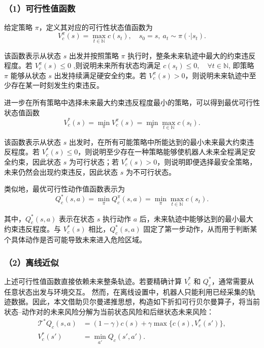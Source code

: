 \subsubsection{（1）可行性值函数}

给定策略 $\pi$，定义其对应的可行性状态值函数为
\begin{equation}
    V_c^\pi(s)
    =
    \max_{t\in\mathbb{N}} c(s_t),
    \quad
    s_0=s,\ a_t\sim\pi(\cdot|s_t).
    \label{eq:vc_pi}
\end{equation}

该函数表示从状态 $s$ 出发并按照策略 $\pi$ 执行时，整条未来轨迹中最大的约束违反程度。若 $V_c^\pi(s)\leq 0$ ,则说明未来所有状态均满足 $c(s_t)\leq 0,\quad \forall t\in\mathbb{N}$,
即策略 $\pi$ 能够从状态 $s$ 出发持续满足硬安全约束。若 $V_c^\pi(s)>0$，则说明未来轨迹中至少存在某一时刻发生约束违反。

进一步在所有策略中选择未来最大约束违反程度最小的策略，可以得到最优可行性状态值函数
\begin{equation}
    V_c^*(s)
    =
    \min_{\pi}V_c^\pi(s)
    =
    \min_{\pi}\max_{t\in\mathbb{N}}c(s_t).
    \label{eq:vc_star}
\end{equation}

该函数表示从状态 $s$ 出发时，在所有可能策略中所能达到的最小未来最大约束违反程度。若 $V_c^*(s)\leq 0$，则说明至少存在一种策略能够使机器人未来全程满足安全约束，因此状态 $s$ 为可行状态；若 $V_c^*(s)>0$，则说明即便选择最安全策略，未来仍然会出现约束违反，因此状态 $s$ 为不可行状态。

类似地，最优可行性动作值函数表示为
\begin{equation}
    Q_c^*(s,a)
    =
    \min_{\pi}Q_c^\pi(s,a)
    =
    \min_{\pi}\max_{t\in\mathbb{N}}c(s_t).
    \label{eq:qc_star}
\end{equation}

其中，$Q_c^*(s,a)$ 表示在状态 $s$ 执行动作 $a$ 后，未来轨迹中能够达到的最小最大约束违反程度。与 $V_c^*(s)$ 相比，$Q_c^*(s,a)$ 固定了第一步动作，从而用于判断某个具体动作是否可能导致未来进入危险区域。

\subsubsection{（2）离线近似}

上述可行性值函数直接依赖未来整条轨迹。若要精确计算 $V_c^*$ 和 $Q_c^*$，通常需要从任意状态出发与环境交互。
然而，在离线设置中，机器人只能利用已经采集的轨迹数据。因此，本文借助贝尔曼递推思想，构造如下折扣可行贝尔曼算子，将当前状态--动作对的未来风险分解为当前状态风险和后继状态未来风险：
\begin{align}
    \mathcal{T}^*Q_c(s,a)
    &=
    (1-\gamma)c(s)
    +
    \gamma\max\{c(s),V_c^*(s')\}, \\
    V_c^*(s')&=\min_{a'}Q_c(s',a').
    \label{eq:feasible_bellman}
\end{align}


